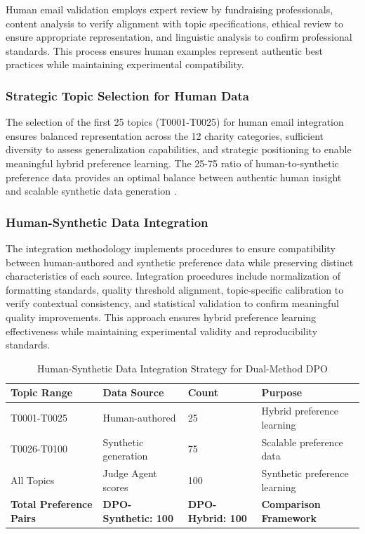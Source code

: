 Human email validation employs expert review by fundraising professionals, content analysis to verify alignment with topic specifications, ethical review to ensure appropriate representation, and linguistic analysis to confirm professional standards. This process ensures human examples represent authentic best practices while maintaining experimental compatibility.

\subsubsection{Strategic Topic Selection for Human Data}

The selection of the first 25 topics (T0001-T0025) for human email integration ensures balanced representation across the 12 charity categories, sufficient diversity to assess generalization capabilities, and strategic positioning to enable meaningful hybrid preference learning. The 25-75 ratio of human-to-synthetic preference data provides an optimal balance between authentic human insight and scalable synthetic data generation \cite{gallego2024configurable_safety}.

\subsubsection{Human-Synthetic Data Integration}

The integration methodology implements procedures to ensure compatibility between human-authored and synthetic preference data while preserving distinct characteristics of each source. Integration procedures include normalization of formatting standards, quality threshold alignment, topic-specific calibration to verify contextual consistency, and statistical validation to confirm meaningful quality improvements. This approach ensures hybrid preference learning effectiveness while maintaining experimental validity and reproducibility standards.

\begin{table}[htbp]
    \centering
    \caption{Human-Synthetic Data Integration Strategy for Dual-Method DPO}
    \label{tab:human-synthetic-integration}
    \begin{tabular}{|l|l|l|l|}
    \hline
    \textbf{Topic Range} & \textbf{Data Source} & \textbf{Count} & \textbf{Purpose} \\
    \hline
    T0001-T0025 & Human-authored & 25 & Hybrid preference learning \\
    T0026-T0100 & Synthetic generation & 75 & Scalable preference data \\
    All Topics & Judge Agent scores & 100 & Synthetic preference learning \\
    \hline
    \textbf{Total Preference Pairs} & \textbf{DPO-Synthetic: 100} & \textbf{DPO-Hybrid: 100} & \textbf{Comparison Framework} \\
    \hline
    \end{tabular}
\end{table}

